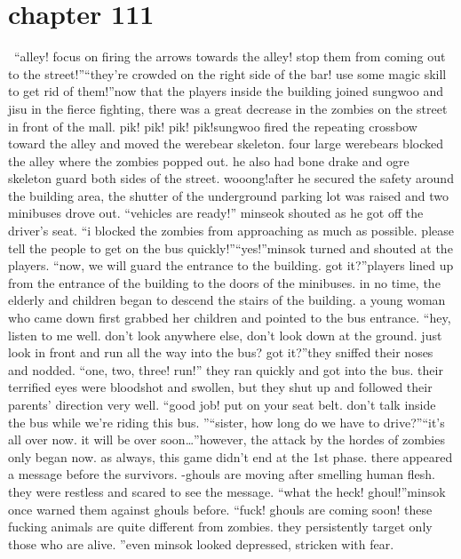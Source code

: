 \section{chapter 111}






 “alley! focus on firing the arrows towards the alley! stop them from coming out to the street!”“they’re crowded on the right side of the bar! use some magic skill to get rid of them!”now that the players inside the building joined sungwoo and jisu in the fierce fighting, there was a great decrease in the zombies on the street in front of the mall.
pik! pik! pik! pik!sungwoo fired the repeating crossbow toward the alley and moved the werebear skeleton.
four large werebears blocked the alley where the zombies popped out.
he also had bone drake and ogre skeleton guard both sides of the street.
wooong!after he secured the safety around the building area, the shutter of the underground parking lot was raised and two minibuses drove out.
“vehicles are ready!” minseok shouted as he got off the driver’s seat.
“i blocked the zombies from approaching as much as possible.
 please tell the people to get on the bus quickly!”“yes!”minsok turned and shouted at the players.
“now, we will guard the entrance to the building.
 got it?”players lined up from the entrance of the building to the doors of the minibuses.
 in no time, the elderly and children began to descend the stairs of the building.
a young woman who came down first grabbed her children and pointed to the bus entrance.
“hey, listen to me well.
 don’t look anywhere else, don’t look down at the ground.
 just look in front and run all the way into the bus? got it?”they sniffed their noses and nodded.
“one, two, three! run!”
they ran quickly and got into the bus.
 their terrified eyes were bloodshot and swollen, but they shut up and followed their parents’ direction very well.
“good job! put on your seat belt.
 don’t talk inside the bus while we’re riding this bus.
”“sister, how long do we have to drive?”“it’s all over now.
 it will be over soon…”however, the attack by the hordes of zombies only began now.
 as always, this game didn’t end at the 1st phase.
 there appeared a message before the survivors.
-ghouls are moving after smelling human flesh.
they were restless and scared to see the message.
“what the heck! ghoul!”minsok once warned them against ghouls before.
“fuck! ghouls are coming soon! these fucking animals are quite different from zombies.
 they persistently target only those who are alive.
”even minsok looked depressed, stricken with fear.
